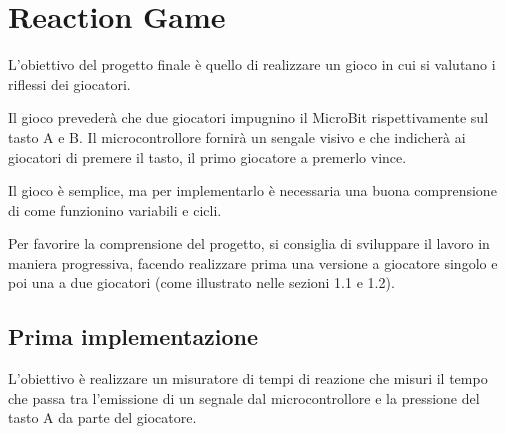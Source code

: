 \documentclass[../../docenti.tex]{subfiles}
\begin{document}
\section{Reaction Game}
L'obiettivo del progetto finale è quello di realizzare un gioco in cui si valutano i riflessi dei giocatori.

Il gioco prevederà che due giocatori impugnino il MicroBit rispettivamente sul tasto A e B.
Il microcontrollore fornirà un sengale visivo e che indicherà ai giocatori di premere il tasto, il primo giocatore a premerlo vince.

Il gioco è semplice, ma per implementarlo è necessaria una buona comprensione di come funzionino variabili e cicli.

Per favorire la comprensione del progetto, si consiglia di sviluppare il lavoro in maniera progressiva, facendo realizzare prima una versione a giocatore singolo e poi una a due giocatori (come illustrato nelle sezioni 1.1 e 1.2).

\subsection{Prima implementazione}

L'obiettivo è realizzare un misuratore di tempi di reazione che misuri il tempo che passa tra l'emissione di un segnale dal microcontrollore e la pressione del tasto A da parte del giocatore.
\end{document}

